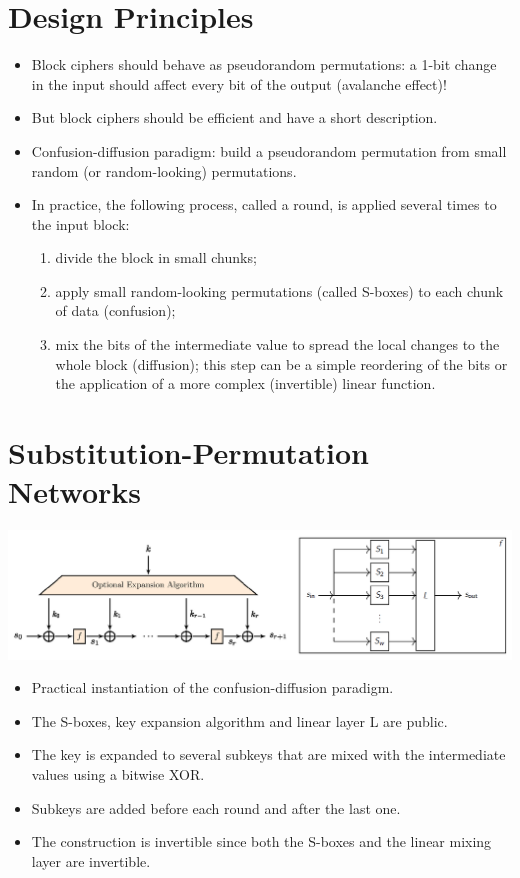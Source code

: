 \section{Design Principles}
	\begin{itemize}
	    \item Block ciphers should behave as pseudorandom permutations: a 1-bit change in the input should affect every bit of the output (avalanche effect)!
	    \item But block ciphers should be efficient and have a short description.
	    \item Confusion-diffusion paradigm: build a pseudorandom permutation from small random (or random-looking) permutations.
	    \item In practice, the following process, called a round, is applied several times to the input block:
	    \begin{enumerate}
	        \item divide the block in small chunks;
	        \item apply small random-looking permutations (called S-boxes) to each chunk of data (confusion);
	        \item mix the bits of the intermediate value to spread the local changes to the whole block (diffusion); this step 
	        can be a simple reordering of the bits or the application of a more complex (invertible) linear function.
	    \end{enumerate}
	\end{itemize}


\section{Substitution-Permutation Networks}
    \begin{center}
		\includegraphics[width=162mm]{Graphics/Block Ciphers/bc1.png}
	\end{center}
	\begin{itemize}
	    \item Practical instantiation of the confusion-diffusion paradigm.
	    \item The S-boxes, key expansion algorithm and linear layer L are public.
	    \item The key is expanded to several subkeys that are mixed with the intermediate values using a bitwise XOR.
	    \item Subkeys are added before each round and after the last one.
	    \item The construction is invertible since both the S-boxes and the linear mixing layer are invertible.
	\end{itemize}


